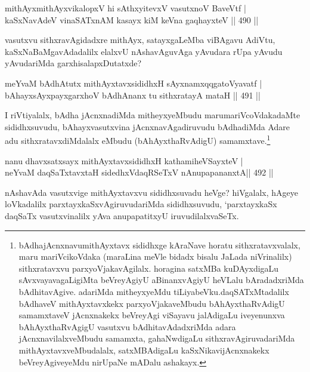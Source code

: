 \begin{shl}
mithAyxmithAyxvikalopxV hi sAthxyitevxV vasutxnoV BaveVtf | \\
kaSxNavAdeV vinaSATxnAM kasayx kiM keVna gaqhayxteV \hfill||  490 ||  
\end{shl}

\begin{artha}
vasutxvu sithxravAgidadxre mithAyx, satayxgaLeMba viBAgavu AdiVtu, kaSxNaBaMgavAdadalilx elalxvU nAshavAguvAga yAvudara rUpa yAvudu yAvudariMda garxhisalapxDutatxde?
\end{artha}


\begin{shl}
meYvaM bAdhAtutx mithAyxtavxsididhxH sAyxnamxqqgatoVyavatf | \\
bAhayxsAyxpayxgarxhoV bAdhAnanx tu sithxratayA mataH \hfill||  491 || 
\end{shl}

\begin{artha}
I riVtiyalalx, bAdha jAcnxnadiMda mitheyxyeMbudu marumariVcoVdakadaMte sididhxsuvudu, bAhayxvasutxvina jAcnxnavAgadiruvudu bAdhadiMda Adare adu sithxratavxdiMdalalx eMbudu (bAhAyxthaRvAdigU) samamxtave.\footnote{bAdhajAcnxnavumithAyxtavx sididhxge kAraNave horatu sithxratavxvalalx, maru mariVcikoVdaka (maraLina meVle bidadx bisalu JaLada niVrinalilx) sithxratavxvu parxyoVjakavAgilalx. horagina satxMBa kuDAyxdigaLu sAvxvayavagaLigiMta beVreyAgiyU aBinanxvAgiyU heVLalu bAradadxriMda bAdhitavAgive. adariMda mitheyxyeMdu tiLiyabeVku.daqSATxMtadalilx bAdhaveV mithAyxtavxkekx parxyoVjakaveMbudu bAhAyxthaRvAdigU samamxtaveV jAcnxnakekx beVreyAgi viSayavu jalAdigaLu iveyenunxva bAhAyxthaRvAgigU vasutxvu bAdhitavAdadxriMda adara jAcnxnavilalxveMbudu samamxta, gahaNwdigaLu sithxravAgiruvadariMda mithAyxtavxveMbudalalx, satxMBAdigaLu kaSxNikavijAcnxnakekx beVreyAgiveyeMdu nirUpaNe mADalu ashakayx.}
\end{artha}

\begin{shl}
nanu dhavxsatxsayx mithAyxtavxsididhxH kathamiheVSayxteV | \\
neYvaM daqSaTxtavxtaH sidedhxVdaqRSeTxV nAnupapananxtA\hfill ||  492 ||  
\end{shl}

\begin{artha}
nAshavAda vasutxvige mithAyxtavxvu sididhxsuvadu heVge? hiVgalalx, hAgeye loVkadalilx parxtayxkaSxvAgiruvudariMda sididhxsuvudu, `parxtayxkaSx daqSaTx vasutxvinalilx yAva anupapatitxyU iruvudilalxvaSeTx.
\end{artha}

